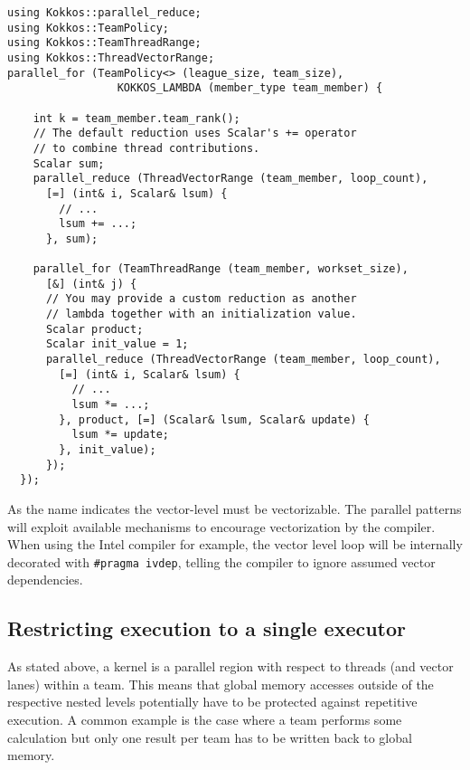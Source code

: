 \begin{lstlisting}
using Kokkos::parallel_reduce;
using Kokkos::TeamPolicy;
using Kokkos::TeamThreadRange;
using Kokkos::ThreadVectorRange;
parallel_for (TeamPolicy<> (league_size, team_size),
                 KOKKOS_LAMBDA (member_type team_member) {

    int k = team_member.team_rank();
    // The default reduction uses Scalar's += operator
    // to combine thread contributions.
    Scalar sum;
    parallel_reduce (ThreadVectorRange (team_member, loop_count),
      [=] (int& i, Scalar& lsum) {
        // ...
        lsum += ...;
      }, sum);

    parallel_for (TeamThreadRange (team_member, workset_size),
      [&] (int& j) {
      // You may provide a custom reduction as another
      // lambda together with an initialization value.
      Scalar product;
      Scalar init_value = 1;
      parallel_reduce (ThreadVectorRange (team_member, loop_count),
        [=] (int& i, Scalar& lsum) {
          // ...
          lsum *= ...;
        }, product, [=] (Scalar& lsum, Scalar& update) {
          lsum *= update;
        }, init_value);
      });
  });
\end{lstlisting}  

As the name indicates the vector-level must be vectorizable. 
The parallel patterns will exploit available mechanisms to encourage vectorization by the compiler. 
When using the Intel compiler for example, the vector level loop will be internally decorated with 
\lstinline|#pragma ivdep|, telling the compiler to ignore assumed vector dependencies.

\subsection{Restricting execution to a single executor}

As stated above, a kernel is a parallel region with respect to threads (and vector lanes) within a team.
This means that global memory accesses outside of the respective nested levels potentially have to be protected against repetitive execution. 
A common example is the case where a team performs some calculation but only one result per team has to be written back to global memory. 

